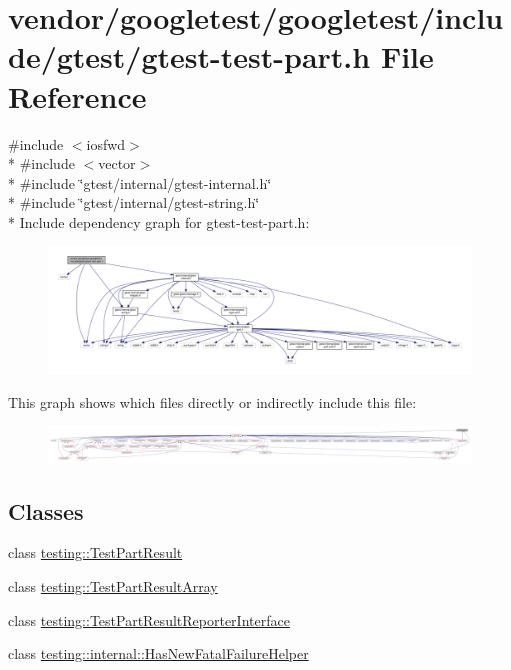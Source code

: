 \hypertarget{gtest-test-part_8h}{}\section{vendor/googletest/googletest/include/gtest/gtest-\/test-\/part.h File Reference}
\label{gtest-test-part_8h}
{\ttfamily \#include $<$iosfwd$>$}\\*
{\ttfamily \#include $<$vector$>$}\\*
{\ttfamily \#include \char`\"{}gtest/internal/gtest-\/internal.\+h\char`\"{}}\\*
{\ttfamily \#include \char`\"{}gtest/internal/gtest-\/string.\+h\char`\"{}}\\*
Include dependency graph for gtest-\/test-\/part.h\+:
\nopagebreak
\begin{figure}[H]
\begin{center}
\leavevmode
\includegraphics[width=350pt]{gtest-test-part_8h__incl}
\end{center}
\end{figure}
This graph shows which files directly or indirectly include this file\+:
\nopagebreak
\begin{figure}[H]
\begin{center}
\leavevmode
\includegraphics[width=350pt]{gtest-test-part_8h__dep__incl}
\end{center}
\end{figure}
\subsection*{Classes}
\begin{DoxyCompactItemize}
\item 
class \hyperlink{classtesting_1_1TestPartResult}{testing\+::\+Test\+Part\+Result}
\item 
class \hyperlink{classtesting_1_1TestPartResultArray}{testing\+::\+Test\+Part\+Result\+Array}
\item 
class \hyperlink{classtesting_1_1TestPartResultReporterInterface}{testing\+::\+Test\+Part\+Result\+Reporter\+Interface}
\item 
class \hyperlink{classtesting_1_1internal_1_1HasNewFatalFailureHelper}{testing\+::internal\+::\+Has\+New\+Fatal\+Failure\+Helper}
\end{DoxyCompactItemize}
